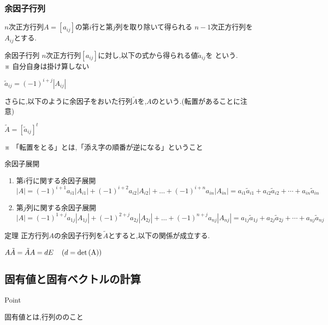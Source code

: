 \documentclass[a4paper]{jsarticle}
\begin{document}
\subsubsection{余因子行列}
$n$次正方行列$A=\left[a_{ij}\right]$の第$i$行と第$j$列を取り除いて得られる
$n-1$次正方行列を$A_{ij}$とする.
\begin{itembox}[l]{余因子行列}
    $n$次正方行列$\left[a_{ij}\right]$に対し,以下の式から得られる値$\tilde{a}_{ij}$を
    という.\\
    ※ 自分自身は掛け算しない
    \begin{center}
        $\tilde{a}_{ij}=\left(-1\right)^{i+j}\left|A_{ij}\right|$
    \end{center}
    さらに,以下のように余因子をおいた行列$\tilde{A}$を,$A$のという.(転置があることに注意)
    \begin{center}
        $\tilde{A}=\left[\tilde{a}_{ij}\right]^t$
    \end{center}
    ※ 「転置をとる」とは,「添え字の順番が逆になる」ということ
\end{itembox}
\begin{itembox}[l]{余因子展開}
    \begin{enumerate}[(1)]
        \item 第$i$行に関する余因子展開\\
              $\left|A\right|=(-1)^{i+1}a_{i1}\left|A_{i1}\right|+(-1)^{i+2}a_{i2}\left|A_{i2}\right|+ \dots +(-1)^{i+n}a_{in}\left|A_{in}\right|
                  =a_{i1}\tilde{a}_{i1}+a_{i2}\tilde{a}_{i2}+\cdots +a_{in}\tilde{a}_{in}$
        \item 第$j$列に関する余因子展開\\
              $\left|A\right|=(-1)^{1+j}a_{1j}\left|A_{1j}\right|+(-1)^{2+j}a_{2j}\left|A_{2j}\right|+ \dots +(-1)^{n+j}a_{nj}\left|A_{nj}\right|
                  =a_{1j}\tilde{a}_{1j}+a_{2j}\tilde{a}_{2j}+\cdots +a_{nj}\tilde{a}_{nj}$
    \end{enumerate}
\end{itembox}
\begin{itembox}[l]{定理}
    正方行列$A$の余因子行列を$\tilde{A}$とすると,以下の関係が成立する.
    \begin{center}
        $A\tilde{A}=\tilde{A}A=dE\quad\left(d=\rm{det}\left(A\right)\right)$
    \end{center}
\end{itembox}
\subsection{固有値と固有ベクトルの計算}
\begin{itembox}[l]{Point}
    \begin{center}
        固有値とは,行列ののこと
    \end{center}
\end{itembox}
\end{document}

